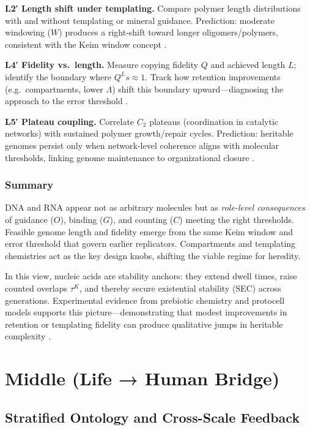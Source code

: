 \documentclass[12pt,a4paper,oneside]{scrreprt}
\begin{document}
\textbf{L2′ Length shift under templating.} 
Compare polymer length distributions with and without templating or mineral guidance. 
Prediction: moderate windowing ($W$) produces a right-shift toward longer oligomers/polymers, consistent with the Keim window concept \cite{Orgel2004,Joyce2018}.

\textbf{L4′ Fidelity vs.\ length.} 
Measure copying fidelity $Q$ and achieved length $L$; identify the boundary where $Q^L s\approx 1$. 
Track how retention improvements (e.g.\ compartments, lower $\Lambda$) shift this boundary upward—diagnosing the approach to the error threshold \cite{Eigen1971}.

\textbf{L5′ Plateau coupling.} 
Correlate $C_2$ plateaus (coordination in catalytic networks) with sustained polymer growth/repair cycles. 
Prediction: heritable genomes persist only when network-level coherence aligns with molecular thresholds, linking genome maintenance to organizational closure \cite{Luisi2006,Chen2017}.

\section*{Summary}
DNA and RNA appear not as arbitrary molecules but as \emph{role-level consequences} of guidance ($O$), binding ($G$), and counting ($C$) meeting the right thresholds. 
Feasible genome length and fidelity emerge from the same Keim window and error threshold that govern earlier replicators. 
Compartments and templating chemistries act as the key design knobs, shifting the viable regime for heredity. 

In this view, nucleic acids are stability anchors: they extend dwell times, raise counted overlaps $\tau^K$, and thereby secure existential stability (SEC) across generations. 
Experimental evidence from prebiotic chemistry and protocell models supports this picture—demonstrating that modest improvements in retention or templating fidelity can produce qualitative jumps in heritable complexity \cite{Eigen1971,Orgel2004,Joyce2018,Chen2017,Luisi2006}.

\part{Middle (Life → Human Bridge)}

\chapter{Stratified Ontology and Cross-Scale Feedback}\label{ch:bridge}
\end{document}
